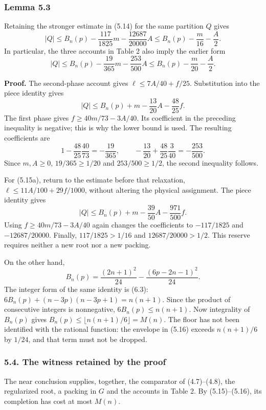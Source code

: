 \documentclass[english,11pt,a4paper]{article}
\begin{document}
\subsubsection{Lemma 5.3}\label{lemma-5.3}

Retaining the stronger estimate in (5.14) for the same partition \(Q\) gives \[
|Q|\le B_n(p)-\frac{117}{1825}m-\frac{12687}{20000}A
\le B_n(p)-\frac m{16}-\frac A2.
\tag{5.15a}
\] In particular, the three accounts in Table 2 also imply the earlier form \[
|Q|\le B_n(p)-\frac{19}{365}m-\frac{253}{500}A
\le B_n(p)-\frac m{20}-\frac A2.
\tag{5.15}
\]

\textbf{Proof.} The second-phase account gives \(\ell\le7A/40+f/25\). Substitution into the piece identity gives \[
|Q|\le B_n(p)+m-\frac{13}{20}A-\frac{48}{25}f.
\] The first phase gives \(f\ge40m/73-3A/40\). Its coefficient in the preceding inequality is negative; this is why the lower bound is used. The resulting coefficients are \[
1-\frac{48}{25}\frac{40}{73}=-\frac{19}{365},\qquad
-\frac{13}{20}+\frac{48}{25}\frac3{40}=-\frac{253}{500}.
\] Since \(m,A\ge0\), \(19/365\ge1/20\) and \(253/500\ge1/2\), the second inequality follows.

For (5.15a), return to the estimate before that relaxation, \(\ell\le11A/100+29f/1000\), without altering the physical assignment. The piece identity gives \[
|Q|\le B_n(p)+m-\frac{39}{50}A-\frac{971}{500}f.
\] Using \(f\ge40m/73-3A/40\) again changes the coefficients to \(-117/1825\) and \(-12687/20000\). Finally, \(117/1825>1/16\) and \(12687/20000>1/2\). This reserve requires neither a new root nor a new packing.

On the other hand, \[
B_n(p)=\frac{(2n+1)^2}{24}-\frac{(6p-2n-1)^2}{24}.
\tag{5.16}
\] The integer form of the same identity is (6.3): \(6B_n(p)+(n-3p)(n-3p+1)=n(n+1)\). Since the product of consecutive integers is nonnegative, \(6B_n(p)\le n(n+1)\). Now integrality of \(B_n(p)\) gives \(B_n(p)\le\lfloor n(n+1)/6\rfloor=M(n)\). The floor has not been identified with the rational function: the envelope in (5.16) exceeds \(n(n+1)/6\) by \(1/24\), and that term must not be dropped.

\subsubsection{5.4. The witness retained by the proof}\label{the-witness-retained-by-the-proof}

The near conclusion supplies, together, the comparator of (4.7)--(4.8), the regularized root, a packing in \(G\) and the accounts in Table 2. By (5.15)--(5.16), its completion has cost at most \(M(n)\).
\end{document}
